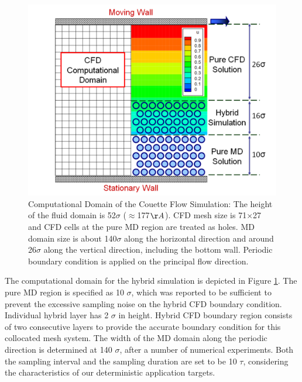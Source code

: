 \documentclass[]{aiaa-tc}%
\begin{document}
\begin{figure}
\includegraphics{Couette_Val_Domain.pdf}
\caption{Computational Domain of the Couette Flow Simulation: The height 
of the fluid domain is 52$\sigma$ ($\approx$177$\AA$). CFD mesh size is 
71$\times$27 and CFD cells at the pure MD region are treated as holes. 
MD domain size is about 140$\sigma$ along the horizontal direction and 
around 26$\sigma$ along the vertical direction, including the bottom wall. 
Periodic boundary condition is applied on the principal flow direction.}
\label{Fig:Couette_Val_Domain}
\end{figure}


The computational domain for the hybrid simulation is depicted in Figure
\ref{Fig:Couette_Val_Domain}. The pure MD region is specified as 10 $\sigma$, 
which was reported to be sufficient to prevent the excessive sampling noise
on the hybrid CFD boundary condition.\cite{Yen} Individual hybrid layer has
2 $\sigma$ in height. Hybrid CFD boundary region consists of two consecutive 
layers to provide the accurate boundary condition for this collocated mesh system.
The width of the MD domain along the periodic direction is determined at 140 
$\sigma$, after a number of numerical experiments.
Both the sampling interval and the sampling duration are set to be 10 $\tau$,
considering the characteristics of our deterministic application targets. 
\end{document}
